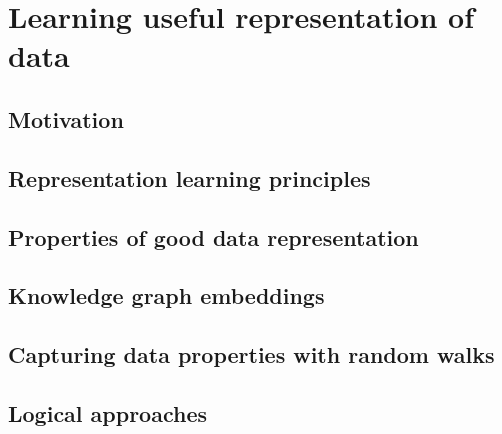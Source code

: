 \chapter{Learning useful representation of data}\label{ch:learningrepresentations}



\section{Motivation}




\section{Representation learning principles}



\section{Properties of good data representation}




\section{Knowledge graph embeddings}



\section{Capturing data properties with random walks}



\section{Logical approaches}



\cleardoublepage

